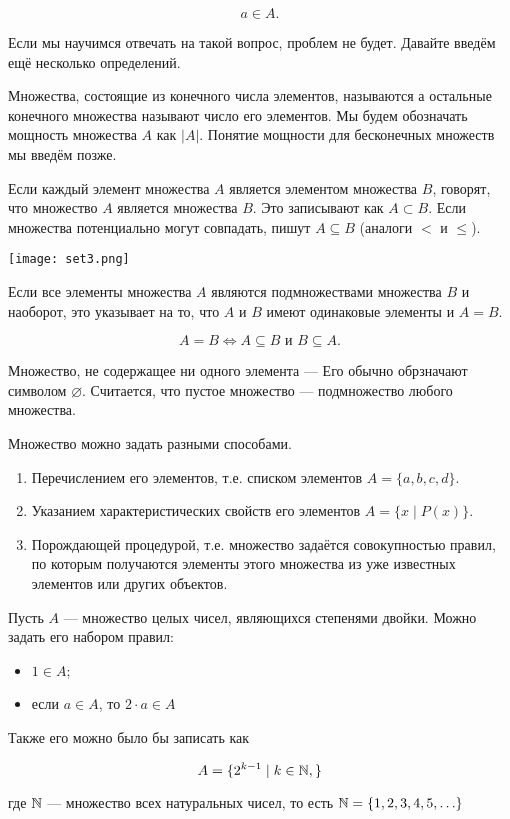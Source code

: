 \documentclass[12pt, a4paper]{article}
\begin{document}
\[
a \in A.
\]

Если мы научимся отвечать на такой вопрос, проблем не будет. Давайте введём ещё несколько определений.

\begin{mydef}
Множества, состоящие из конечного числа элементов, называются  а остальные   конечного множества называют число его элементов. Мы будем обозначать мощность множества $A$ как $|A|$. Понятие мощности для бесконечных множеств мы введём позже. 
\end{mydef}

\begin{mydef}
Если каждый элемент множества $A$ является элементом множества $B$, говорят, что множество $A$ является  множества $B$. Это записывают как $A \subset B.$ Если множества потенциально могут совпадать, пишут $A \subseteq B$ (аналоги $<$ и $\leq$).  
\end{mydef}

\begin{center}
    \texttt{[image: set3.png]}
\end{center}

Если все элементы множества $A$ являются подмножествами множества $B$ и наоборот, это указывает на то, что $A$ и $B$ имеют одинаковые элементы и $A = B$.

\[ 
A = B  \Leftrightarrow A \subseteq B \text{ и } B \subseteq A.
\]

Множество, не содержащее ни одного элемента ---  Его обычно обрзначают символом $\varnothing.$ Считается, что пустое множество --- подмножество любого множества. 
 
Множество можно задать разными способами.

\begin{enumerate}
    \item Перечислением его элементов, т.е. списком элементов $A = \{a,b,c,d\}.$
    \item Указанием характеристических свойств его элементов $A = \{x \mid P(x)\}.$
    \item Порождающей процедурой, т.е. множество задаётся совокупностью правил, по которым получаются элементы этого множества из уже известных элементов или других объектов.
\end{enumerate}

\begin{myex} 
Пусть $A$ --- множество целых чисел, являющихся степенями двойки. Можно задать его набором правил:
     \begin{itemize}
         \item $1 \in A$;
         \item если $a \in A$, то $2 \cdot a \in A$
     \end{itemize}

Также его можно было бы записать как 

\[
A = \{2^{k - 1} \mid k \in \mathbb N,\}
\]

где $\mathbb N$ --- множество всех натуральных чисел, то есть $\mathbb N = \{1, 2, 3, 4, 5, \ldots \}$
\end{myex} 
\end{document}
